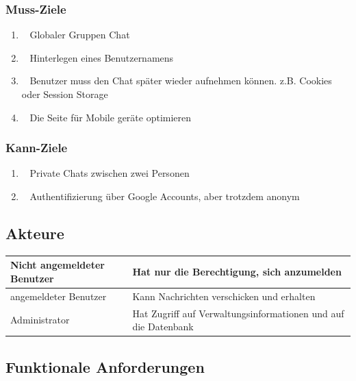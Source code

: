 \documentclass[12pt]{article}
\begin{document}
      \subsubsection{Muss-Ziele}
        \begin{enumerate}
          \item \faGlobe~   Globaler Gruppen Chat
          \item \faUser~    Hinterlegen eines Benutzernamens
          \item \faKey~     Benutzer muss den Chat später wieder aufnehmen können. z.B. Cookies oder Session Storage
          \item \faMobile~  Die Seite für Mobile geräte optimieren
        \end{enumerate}

      \subsubsection{Kann-Ziele}
        \begin{enumerate}
          \item \faUsers~   Private Chats zwischen zwei Personen
          \item \faGoogle~  Authentifizierung über Google Accounts, aber trotzdem anonym
        \end{enumerate}

    \subsection{Akteure}
        \begin{table}[H]
          \begin{tabularx}{\textwidth}{|l|X|}
            \hline
            Nicht angemeldeter Benutzer & Hat nur die Berechtigung, sich anzumelden  \\ \hline
            angemeldeter Benutzer & Kann Nachrichten verschicken und erhalten  \\ \hline
            Administrator & Hat Zugriff auf Verwaltungsinformationen und auf die Datenbank \\ \hline
          \end{tabularx}
        \end{table}


    \subsection{Funktionale Anforderungen}
\end{document}
